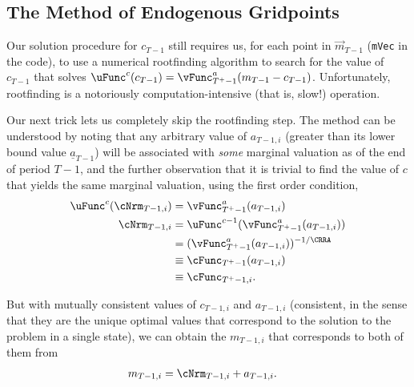 \documentclass[titlepage, headings=optiontotocandhead]{\econtex}
\begin{document}
\hypertarget{The-Method-of-Endogenous-Gridpoints}{}
\subsection{The Method of Endogenous Gridpoints}

Our solution procedure for ${c}_{T-1}$ still requires us, for each
point in $\vec{m}_{T-1}$ (\texttt{mVec} in the code), to use a
numerical rootfinding algorithm to search for the value of ${c}_{T-1}$
that solves $\uFunc^{{c}}({c}_{T-1}) =
\vFunc^{{a}}_{T^{+}-1}({m}_{T-1}-{c}_{T-1})$.  Unfortunately, rootfinding
is a notoriously computation-intensive (that is, slow!) operation.

Our next trick lets us completely skip the rootfinding step.  The method can be understood by noting that
any arbitrary value of ${a}_{T-1,i}$ (greater than its lower bound
value $\underline{a}_{T-1}$) will be associated with \textit{some}
marginal valuation as of the end of period $T-1$, and the further
observation that it is trivial to find the value of ${c}$ that yields
the same marginal valuation, using the first order condition,
\begin{equation}\begin{gathered}\begin{aligned}
      \uFunc^{{c}}({\cNrm}_{T-1,i})  & = 
      \vFunc^{{a}}_{T^{+}-1}({a}_{T-1,i}) \label{eq:eulerTm1}
      \\ {\cNrm}_{T-1,i}  & = \uFunc^{{c}-1}(\vFunc^{{a}}_{T^{+}-1}({a}_{T-1,i}))
      \\  & = (\vFunc^{{a}}_{T^{+}-1}({a}_{T-1,i}))^{-1/\CRRA}
      \\  & \equiv  \cFunc_{T^{+}-1}({a}_{T-1,i})
      \\  & \equiv  \cFunc_{T^{+}-1,i}
      .
    \end{aligned}\end{gathered}\end{equation}

But with mutually consistent values of ${c}_{T-1,i}$ and ${a}_{T-1,i}$ (consistent, in the sense that they are the unique optimal
values that correspond to the solution to the problem in a single state), we can
obtain the ${m}_{T-1,i}$ that corresponds to both of them from
\begin{equation}\begin{gathered}\begin{aligned}
      {m}_{T-1,i}  & = {\cNrm}_{T-1,i}+{a}_{T-1,i}.
    \end{aligned}\end{gathered}\end{equation}
\end{document}
